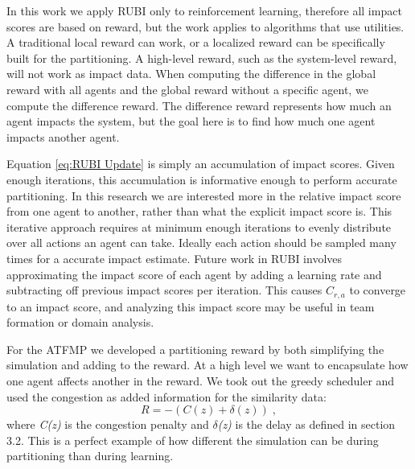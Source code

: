 \documentclass{aamas2014}
\begin{document}
In this work we apply RUBI only to reinforcement learning, therefore all impact scores are based on reward, but the work applies to algorithms that use utilities. A traditional local reward can work, or a localized reward can be specifically built for the partitioning. A high-level reward, such as the system-level reward, will not work as impact data. When computing the difference in the global reward with all agents and the global reward without a specific agent, we compute the difference reward. The difference reward represents how much an agent impacts the system, but the goal here is to find how much one agent impacts another agent.

Equation \ref{eq:RUBI Update} is simply an accumulation of impact scores. Given enough iterations, this accumulation is informative enough to perform accurate partitioning. In this research we are interested more in the relative impact score from one agent to another, rather than what the explicit impact score is. This iterative approach requires at minimum enough iterations to evenly distribute over all actions an agent can take. Ideally each action should be sampled many times for a accurate impact estimate. Future work in RUBI involves approximating the impact score of each agent by adding a learning rate and subtracting off previous impact scores per iteration. This causes $C_{r,a}$ to converge to an impact score, and analyzing this impact score may be useful in team formation or domain analysis.




For the ATFMP we developed a partitioning reward by both simplifying the simulation and adding to the reward. At a high level we want to encapsulate how one agent affects another in the reward. We took out the greedy scheduler and used the congestion as added information for the similarity data:
%
\begin{equation} \label{eq:RUBI ATFMP-L}
R = -(C(z) + \delta(z))\;,
\end{equation}
%
where \textit{C(z)} is the congestion penalty and \textit{$\delta$(z)} is the delay as defined in section 3.2. This is a perfect example of how different the simulation can be during partitioning than during learning.
\end{document}
